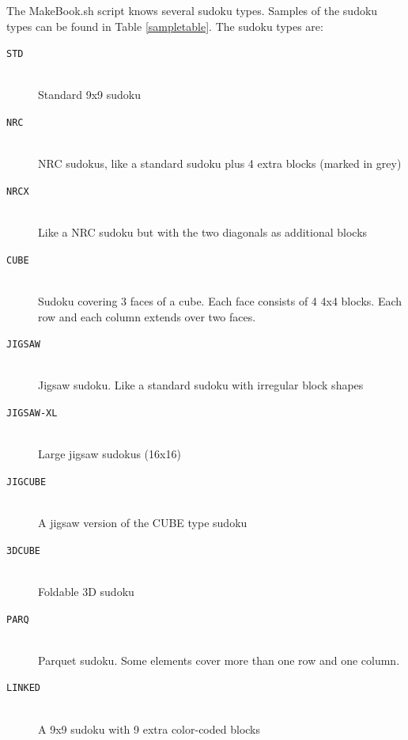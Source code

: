 \documentclass[12pt]{article}
\begin{document}
The MakeBook.sh script knows several sudoku types. Samples of the sudoku types can be found in Table \ref{sampletable}. The sudoku types are:
\begin{description}
\item [\texttt{STD}] \hfill \\Standard 9x9 sudoku
\item [\texttt{NRC}] \hfill \\ NRC sudokus, like a standard sudoku plus 4 extra blocks (marked in grey)
\item [\texttt{NRCX}] \hfill \\ Like a NRC sudoku but with the two diagonals as additional blocks
\item [\texttt{CUBE}] \hfill \\ Sudoku covering 3 faces of a cube. Each face consists of 4 4x4 blocks. Each row and each column extends over two faces.
\item [\texttt{JIGSAW}] \hfill \\ Jigsaw sudoku. Like a standard sudoku with irregular block shapes
\item [\texttt{JIGSAW-XL}] \hfill \\ Large jigsaw sudokus (16x16)
\item [\texttt{JIGCUBE}] \hfill \\ A jigsaw version of the CUBE type sudoku
\item [\texttt{3DCUBE}] \hfill \\ Foldable 3D sudoku
\item [\texttt{PARQ}]  \hfill \\ Parquet sudoku. Some elements cover more than one row and one column.
\item [\texttt{LINKED}]  \hfill \\ A 9x9 sudoku with 9 extra color-coded blocks 
\end{description}
\end{document}
